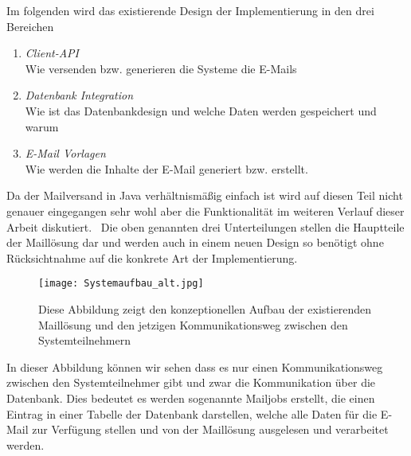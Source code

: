 Im folgenden wird das existierende Design der Implementierung in den drei Bereichen
\begin{enumerate}
	\item \emph{Client-API}\\
	      Wie versenden bzw. generieren die Systeme die E-Mails
	\item \emph{Datenbank Integration}\\
	      Wie ist das Datenbankdesign und welche Daten werden gespeichert und warum
	\item \emph{E-Mail Vorlagen}\\
	      Wie werden die Inhalte der E-Mail generiert bzw. erstellt.
\end{enumerate}
Da der Mailversand in Java verhältnismäßig einfach ist wird auf diesen Teil nicht genauer eingegangen sehr wohl aber die Funktionalität im weiteren Verlauf dieser Arbeit diskutiert. \
Die oben genannten drei Unterteilungen stellen die Hauptteile der Maillösung dar und werden auch in einem neuen Design so benötigt ohne Rücksichtnahme auf die konkrete Art der Implementierung.
\begin{figure}[h]
\centering
\texttt{[image: Systemaufbau\_alt.jpg]} %
\caption{Diese Abbildung zeigt den konzeptionellen Aufbau der existierenden Maillösung und den jetzigen Kommunikationsweg zwischen den Systemteilnehmern}
\label{fig:systemaufbau-alt}
\end{figure}
\newpage
In dieser Abbildung können wir sehen dass es nur einen Kommunikationsweg zwischen den Systemteilnehmer gibt und zwar die Kommunikation über die Datenbank. Dies bedeutet es werden sogenannte Mailjobs erstellt, die einen Eintrag in einer Tabelle der Datenbank darstellen, welche alle Daten für die E-Mail zur Verfügung stellen und von der Maillösung ausgelesen und verarbeitet werden.\\
